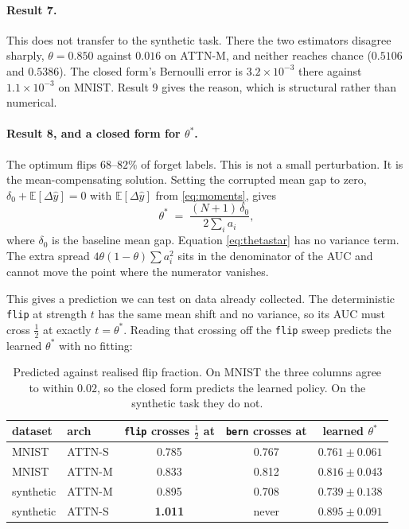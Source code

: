 \documentclass[11pt,a4paper]{article}
\begin{document}
\paragraph{Result 7.} This does not transfer to the synthetic task. There the
two estimators disagree sharply, $\theta=0.850$ against $0.016$ on ATTN-M, and
neither reaches chance ($0.5106$ and $0.5386$). The closed form's Bernoulli
error is $3.2\times10^{-3}$ there against $1.1\times10^{-3}$ on MNIST. Result 9
gives the reason, which is structural rather than numerical.

\paragraph{Result 8, and a closed form for $\theta^*$.} The optimum flips
$68$--$82\%$ of forget labels. This is not a small perturbation. It is the
mean-compensating solution. Setting the corrupted mean gap to zero,
$\delta_0 + \mathbb E[\Delta\hat y] = 0$ with $\mathbb E[\Delta\hat y]$ from
\eqref{eq:moments}, gives
\begin{equation}
\theta^* \;=\; \frac{(N+1)\,\delta_0}{2\sum_i a_i},
\label{eq:thetastar}
\end{equation}
where $\delta_0$ is the baseline mean gap. Equation \eqref{eq:thetastar} has no
variance term. The extra spread $4\theta(1-\theta)\sum a_i^2$ sits in the
denominator of the AUC and cannot move the point where the numerator
vanishes.

This gives a prediction we can test on data already collected. The
deterministic \texttt{flip} at strength $t$ has the same mean shift and no
variance, so its AUC must cross $\tfrac12$ at exactly $t=\theta^*$. Reading
that crossing off the \texttt{flip} sweep predicts the learned $\theta^*$ with
no fitting:

\begin{table}[H]\centering\small
\begin{tabular}{llccc}
\toprule
dataset & arch & \texttt{flip} crosses $\tfrac12$ at & \texttt{bern} crosses at & learned $\theta^*$\\
\midrule
MNIST      & ATTN-S & 0.785 & 0.767 & $0.761\pm0.061$\\
MNIST      & ATTN-M & 0.833 & 0.812 & $0.816\pm0.043$\\
\addlinespace
synthetic  & ATTN-M & 0.895 & 0.708 & $0.739\pm0.138$\\
synthetic  & ATTN-S & \textbf{1.011} & never & $0.895\pm0.091$\\
\bottomrule
\end{tabular}
\caption{Predicted against realised flip fraction. On MNIST the three columns
agree to within $0.02$, so the closed form predicts the learned policy. On the
synthetic task they do not.}
\label{tab:thetastar}
\end{table}
\end{document}
